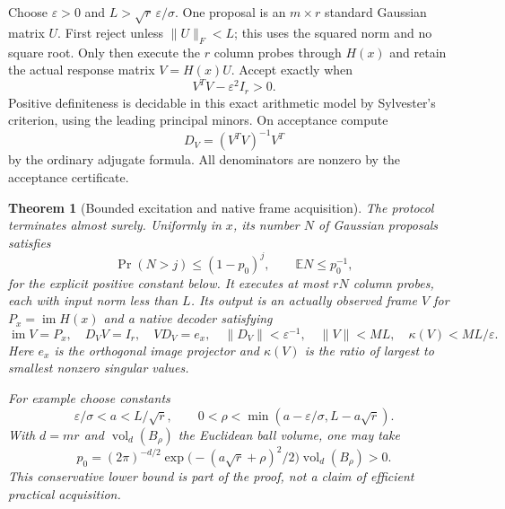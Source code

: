 \documentclass[11pt]{article}
\newtheorem{theorem}{Theorem}[section]
\theoremstyle{definition}
\theoremstyle{remark}
\newcommand{\im}{\operatorname{im}}
\begin{document}
Choose $\varepsilon>0$ and $L>\sqrt r\,\varepsilon/\sigma$. One proposal is an $m\times r$ standard Gaussian matrix $U$. First reject unless $\|U\|_F<L$; this uses the squared norm and no square root. Only then execute the $r$ column probes through $H(x)$ and retain the actual response matrix $V=H(x)U$. Accept exactly when
\begin{equation}\label{eq:accept}
                       V^TV-\varepsilon^2I_r>0.
\end{equation}
Positive definiteness is decidable in this exact arithmetic model by Sylvester's criterion, using the leading principal minors. On acceptance compute
\[
                  D_V=(V^TV)^{-1}V^T
\]
by the ordinary adjugate formula. All denominators are nonzero by the acceptance certificate.

\begin{theorem}[Bounded excitation and native frame acquisition]\label{thm:frames}
The protocol terminates almost surely. Uniformly in $x$, its number $N$ of Gaussian proposals satisfies
\[
 \Pr(N>j)\le(1-p_0)^j,
 \qquad \mathbb E N\le p_0^{-1},
\]
for the explicit positive constant below. It executes at most $rN$ column probes, each with input norm less than $L$. Its output is an actually observed frame $V$ for $P_x=\im H(x)$ and a native decoder satisfying
\[
 \im V=P_x,\quad D_VV=I_r,\quad VD_V=e_x,\quad
 \|D_V\|<\varepsilon^{-1},\quad
 \|V\|<ML,\quad \kappa(V)<ML/\varepsilon.
\]
Here $e_x$ is the orthogonal image projector and $\kappa(V)$ is the ratio of largest to smallest nonzero singular values.

For example choose constants
\[
 \varepsilon/\sigma<a<L/\sqrt r,
 \qquad 0<\rho<\min(a-\varepsilon/\sigma,L-a\sqrt r).
\]
With $d=mr$ and $\operatorname{vol}_d(B_\rho)$ the Euclidean ball volume, one may take
\begin{equation}\label{eq:pbound}
 p_0=(2\pi)^{-d/2}
       \exp\bigl(-(a\sqrt r+\rho)^2/2\bigr)
       \operatorname{vol}_d(B_\rho)>0.
\end{equation}
This conservative lower bound is part of the proof, not a claim of efficient practical acquisition.
\end{theorem}
\end{document}
